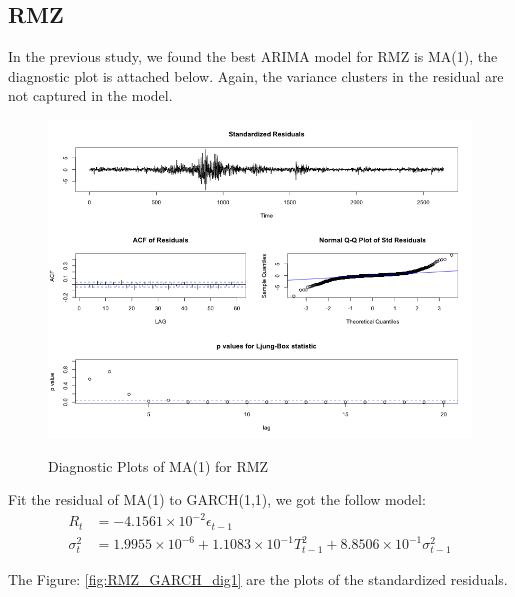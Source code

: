 \documentclass[12pt]{article}
\begin{document}
\subsection{RMZ}
In the previous study, we found the best ARIMA model for RMZ is MA(1), the diagnostic plot is attached below. Again, the variance clusters in the residual are not captured in the model.

\begin{figure}
  \caption{Diagnostic Plots of MA(1) for RMZ}
  \includegraphics[width = \textwidth]{../results/DiagnosticRMZ}
  \label{fig:DiagnosticRMZ}
\end{figure}

Fit the residual of MA(1) to GARCH(1,1), we got the follow model:
\begin{align*}
R_t &= -4.1561\times 10^{-2}\epsilon_{t-1} \\
\sigma_t^2 & = 1.9955 \times 10^{-6} +1.1083\times 10^{-1} T_{t-1}^2 +8.8506\times 10^{-1}  \sigma_{t-1}^2
\end{align*}

The Figure: \ref{fig:RMZ_GARCH_dig1} are the plots of the standardized residuals. 
\end{document}
